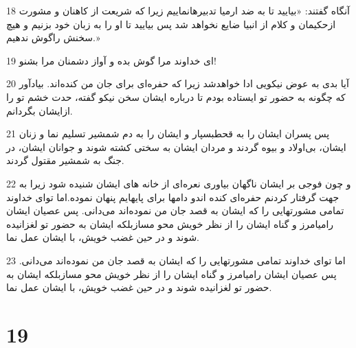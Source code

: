 \par 18 آنگاه گفتند: «بیایید تا به ضد ارمیا تدبیرهانماییم زیرا که شریعت از کاهنان و مشورت ازحکیمان و کلام از انبیا ضایع نخواهد شد پس بیایید تا او را به زبان خود بزنیم و هیچ سخنش راگوش ندهیم.»
\par 19 ‌ای خداوند مرا گوش بده و آواز دشمنان مرا بشنو!
\par 20 آیا بدی به عوض نیکویی ادا خواهدشد زیرا که حفره‌ای برای جان من کنده‌اند. بیادآور که چگونه به حضور تو ایستاده بودم تا درباره ایشان سخن نیکو گفته، حدت خشم تو را ازایشان بگردانم.
\par 21 پس پسران ایشان را به قحطبسپار و ایشان را به دم شمشیر تسلیم نما و زنان ایشان، بی‌اولاد و بیوه گردند و مردان ایشان به سختی کشته شوند و جوانان ایشان، در جنگ به شمشیر مقتول گردند.
\par 22 و چون فوجی بر ایشان ناگهان بیاوری نعره‌ای از خانه های ایشان شنیده شود زیرا به جهت گرفتار کردنم حفره‌ای کنده اندو دامها برای پایهایم پنهان نموده.اما تو‌ای خداوند تمامی مشورتهایی را که ایشان به قصد جان من نموده‌اند می‌دانی. پس عصیان ایشان رامیامرز و گناه ایشان را از نظر خویش محو مسازبلکه ایشان به حضور تو لغزانیده شوند و در حین غضب خویش، با ایشان عمل نما.
\par 23 اما تو‌ای خداوند تمامی مشورتهایی را که ایشان به قصد جان من نموده‌اند می‌دانی. پس عصیان ایشان رامیامرز و گناه ایشان را از نظر خویش محو مسازبلکه ایشان به حضور تو لغزانیده شوند و در حین غضب خویش، با ایشان عمل نما.
 
\chapter{19}

